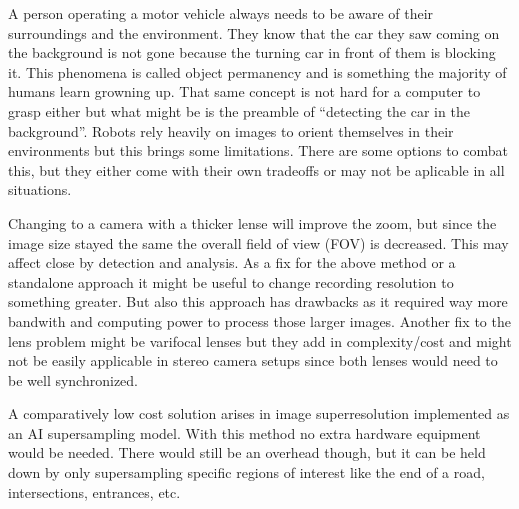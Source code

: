 A person operating a motor vehicle always needs to be aware of their surroundings and the environment. They know that the car they saw coming on the background is not gone because the turning car in front of them is blocking it.  This phenomena is called object permanency and is something the majority of humans learn growning up.
That same concept is not hard for a computer to grasp either but what might be is the preamble of \enquote{detecting the car in the background}. Robots rely heavily on images to orient themselves in their environments but this brings some limitations.
There are some options to combat this, but they either come with their own tradeoffs or may not be aplicable in all situations.

Changing to a camera with a thicker lense will improve the zoom, but since the image size stayed the same the overall field of view (FOV) is decreased. This may affect close by detection and analysis.
As a fix for the above method or a standalone approach it might be useful to change recording resolution to something greater. But also this approach has drawbacks as it required way more bandwith and computing power to process those larger images.
Another fix to the lens problem might be varifocal lenses but they add in complexity/cost and might not be easily applicable in stereo camera setups since both lenses would need to be well synchronized.

A comparatively low cost solution arises in image superresolution implemented as an AI supersampling model. With this method no extra hardware equipment would be needed.
There would still be an overhead though, but it can be held down by only supersampling specific regions of interest like the end of a road, intersections, entrances, etc.
